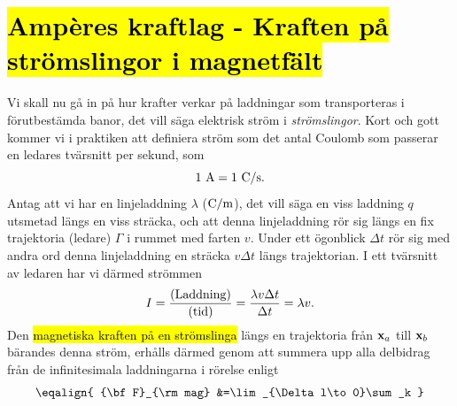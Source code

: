 {{\section{{\hl{Amp{\`e}res kraftlag - Kraften p{\aa} str{\"o}mslingor i
  magnetf{\"a}lt}}}
Vi skall nu g{\aa} in p{\aa} hur krafter verkar p{\aa} laddningar som
transporteras i f{\"o}rutbest{\"a}mda banor, det vill s{\"a}ga elektrisk
str{\"o}m i {\it str{\"o}mslingor}.
\noindent
Kort och gott kommer vi i praktiken att definiera str{\"o}m som det antal
Coulomb som passerar en ledares tv{\"a}rsnitt per sekund, som
$$
  1~\hbox{A} = 1~\hbox{C}/\hbox{s}.
$$
Antag att vi har en linjeladdning $\lambda$ (${\rm C}/{\rm m}$), det vill
s{\"a}ga en viss laddning $q$ utsmetad l{\"a}ngs en viss str{\"a}cka, och att
denna linjeladdning r{\"o}r sig l{\"a}ngs en fix trajektoria (ledare) $\Gamma$
i rummet med farten $v$. Under ett {\"o}gonblick $\Delta t$ r{\"o}r sig med
andra ord denna linjeladdning en str{\"a}cka $v\Delta t$ l{\"a}ngs trajektorian.
I ett tv{\"a}rsnitt av ledaren har vi d{\"a}rmed str{\"o}mmen
\hl{$$
  I={{\hbox{(Laddning)}}\over{\hbox{(tid)}}}
   ={{\lambda v \Delta t}\over{\Delta t}}
   =\lambda v.
$$}
\noindent
Den {\hl{magnetiska kraften p{\aa} en str{\"o}mslinga}} l{\"a}ngs en trajektoria
fr{\aa}n ${\bf x}_a$ till ${\bf x}_b$ b{\"a}randes denna str{\"o}m, erh{\aa}lls
d{\"a}rmed genom att summera upp alla delbidrag fr{\aa}n de infinitesimala
laddningarna i r{\"o}relse enligt
\hl{$$
  \eqalign{
    {\bf F}_{\rm mag}
      &=\lim_{\Delta l\to0}\sum_k
}$$}}}
